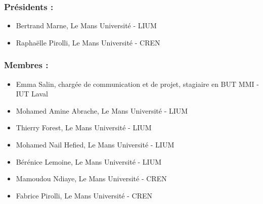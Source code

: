 \subsubsection*{Présidents :}

\begin{itemize}
	\item[] Bertrand Marne, Le Mans Université - LIUM
	\item[] Raphaëlle Pirolli, Le Mans Université - CREN
\end{itemize}

\subsubsection*{Membres :}

\begin{itemize}
    \item[] Emma Salin, chargée de communication et de projet, stagiaire en BUT MMI - IUT Laval
    \item[] Mohamed Amine Abrache, Le Mans Université - LIUM
    \item[] Thierry Forest, Le Mans Université - LIUM
    \item[] Mohamed Nail Hefied, Le Mans Université - LIUM
    \item[] Bérénice Lemoine, Le Mans Université - LIUM
    \item[] Mamoudou Ndiaye,  Le Mans Université - CREN
    \item[] Fabrice Pirolli, Le Mans Université - CREN 
\end{itemize}